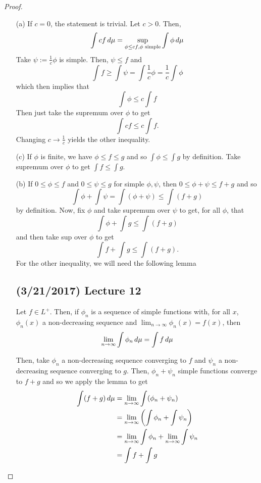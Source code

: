 \documentclass[11pt,leqno,oneside]{amsbook}
\numberwithin{thm}{section}
\begin{document}
\begin{proof}
  \begin{enumerate}
  \item[(a)] If $c=0$, the statement is trivial. Let $c > 0$. Then, \[
      \int c f \, d\mu = \sup_{\phi \leq cf, \phi \text{ simple}} \int
      \phi \, d\mu
    \]
    Take $\psi := \frac{1}{c}\phi$ is simple. Then, $\psi \leq f$
    and \[
      \int f \geq \int \psi = \int \frac{1}{c} \phi = \frac{1}{c} \int \phi
    \]
    which then implies that \[
      \int \phi \leq c \int f
    \]
    Then just take the supremum over $\phi$ to get \[
      \int cf \leq c \int f.
    \]
    Changing $c \to \frac{1}{c}$ yields the other inequality.
  \item[(c)] If $\phi$ is finite, we have $\phi \leq f \leq g$ and so
    $\int \phi \leq \int g$ by definition. Take supremum over $\phi$
    to get $\int f \leq \int g$.
  \item[(b)] If $0 \leq \phi \leq f$ and $0 \leq \psi \leq g$ for
    simple $\phi,\psi$, then $0 \leq \phi+\psi \leq f+g$ and so \[
      \int \phi + \int \psi = \int(\phi + \psi) \leq \int (f+g)
    \]
    by definition. Now, fix $\phi$ and take supremum over $\psi$ to
    get, for all $\phi$, that \[
      \int \phi + \int g \leq \int(f+g)
    \]
    and then take sup over $\phi$ to get \[
      \int f + \int g \leq \int(f+g).
    \]
    For the other inequality, we will need the following lemma
    \subsection*{(3/21/2017) Lecture 12}
    \begin{lem}\label{lem26}
  Let $f \in L^+$. Then, if $\phi_n$ is a sequence of simple functions
  with, for all $x$, $\phi_n(x)$ a non-decreasing sequence and
  $\lim_{n \to \infty} \phi_n(x) = f(x)$, then \[
    \lim_{n \to \infty} \int \phi_n \, d\mu = \int f \, d\mu
  \]
  \end{lem}
  Then, take $\phi_n$ a non-decreasing sequence converging to $f$ and
  $\psi_n$ a non-decreasing sequence converging to $g$. Then, $\phi_n
  + \psi_n$ simple functions converge to $f+g$ and so we apply the
  lemma to get
  \begin{align*}
    \int (f+g) \, d\mu & = \lim_{n \to \infty} \int (\phi_n+\psi_n) \\
                    & = \lim_{n \to \infty}\left( \int \phi_n + \int \psi_n \right)\\
    & = \lim_{n \to \infty} \int \phi_n + \lim_{n \to \infty} \int
      \psi_n \\
    & = \int f + \int g
  \end{align*}
  \end{enumerate}
\end{proof}
\end{document}
